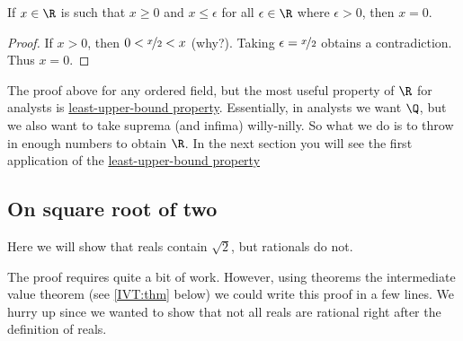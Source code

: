 \documentclass[12pt]{book}
\begin{document}
\begin{prop}
If $x \in \R$ is such that $x \geq 0$ and $x \leq \epsilon$ for all
$\epsilon \in \R$ where
$\epsilon > 0$, then $x = 0$.
\end{prop}

\begin{proof}
If $x > 0$, then $0 < \nicefrac{x}{2} < x$ (why?).  
Taking $\epsilon = \nicefrac{x}{2}$ obtains a contradiction.  
Thus $x=0$.
\end{proof}

The proof above for any ordered field, but the most useful property of $\R$ for analysts is \hyperref[defn:lub]{least-upper-bound property}.  
Essentially, in analysts we want $\Q$, but we also want to take suprema (and infima) willy-nilly.  
So what we do is to throw in enough numbers to obtain $\R$.
In the next section you will see the first application of the \hyperref[defn:lub]{least-upper-bound property}

\subsection*{On square root of two}

Here we will show that reals contain $\sqrt{2}$, but rationals do not.

The proof requires quite a bit of work.
However, using theorems the intermediate value theorem (see \ref{IVT:thm} below)
we could write this proof in a few lines.
We hurry up since we wanted to show that not all reals are rational right after the definition of reals.
\end{document}
